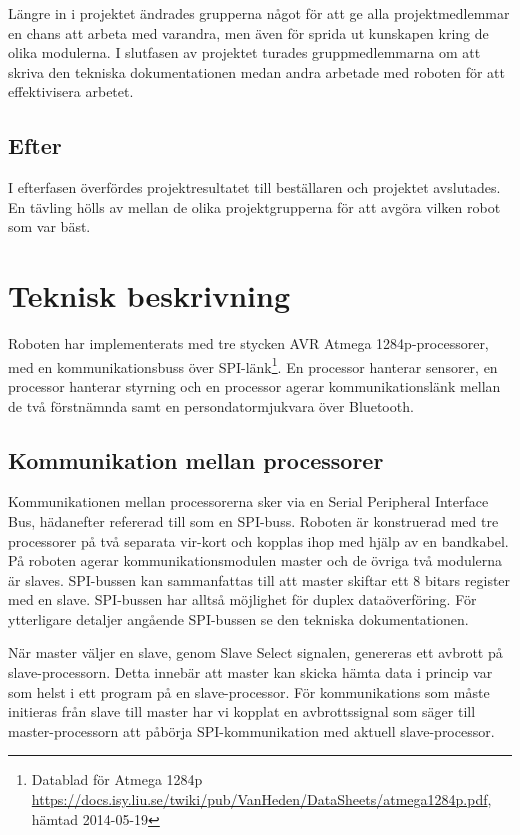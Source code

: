 ﻿\documentclass[a4paper,12pt,fleqn]{article}
\begin{document}
Längre in i projektet ändrades grupperna något för att ge alla projektmedlemmar en chans att arbeta med varandra, men även för sprida ut kunskapen kring de olika modulerna.
I slutfasen av projektet turades gruppmedlemmarna om att skriva den tekniska dokumentationen medan andra arbetade med roboten för att effektivisera arbetet.

\subsection{Efter}
I efterfasen överfördes projektresultatet till beställaren och projektet avslutades. En tävling hölls av mellan de olika projektgrupperna för att avgöra vilken robot som var bäst. 

\section{Teknisk beskrivning}
Roboten har implementerats med tre stycken AVR Atmega 1284p-processorer, med en kommunikationsbuss över SPI-länk\footnote{Datablad för Atmega 1284p \url{https://docs.isy.liu.se/twiki/pub/VanHeden/DataSheets/atmega1284p.pdf}, hämtad 2014-05-19}. En processor hanterar sensorer, en processor hanterar styrning och en processor agerar kommunikationslänk mellan de två förstnämnda samt en persondatormjukvara över Bluetooth. 

\subsection{Kommunikation mellan processorer}
Kommunikationen mellan processorerna sker via en Serial Peripheral Interface Bus, hädanefter refererad till som en SPI-buss.
Roboten är konstruerad med tre processorer på två separata vir-kort och kopplas ihop med hjälp av en bandkabel. På roboten agerar kommunikationsmodulen master och de övriga två modulerna är slaves. SPI-bussen kan sammanfattas till att master skiftar ett 8 bitars register med en slave. SPI-bussen har alltså möjlighet för duplex dataöverföring. För ytterligare detaljer angående SPI-bussen se den tekniska dokumentationen.

När master väljer en slave, genom Slave Select signalen, genereras ett avbrott på slave-processorn. Detta innebär att master kan skicka hämta data i princip var som helst i ett program på en slave-processor. För kommunikations som måste initieras från slave till master har vi kopplat en avbrottssignal som säger till master-processorn att påbörja SPI-kommunikation med aktuell slave-processor.
\end{document}
